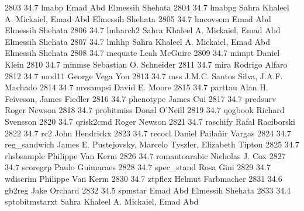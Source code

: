   2803     34.7    lmabp         Emad Abd Elmessih Shehata               
  2804     34.7    lmabpg        Sahra Khaleel A. Mickaiel, Emad Abd     
                                   Elmessih Shehata                        
  2805     34.7    lmcovsem      Emad Abd Elmessih Shehata               
  2806     34.7    lmharch2      Sahra Khaleel A. Mickaiel, Emad Abd     
                                   Elmessih Shehata                        
  2807     34.7    lmhhp         Sahra Khaleel A. Mickaiel, Emad Abd     
                                   Elmessih Shehata                        
  2808     34.7    mequate       Leah McGuire                            
  2809     34.7    mimpt         Daniel Klein                            
  2810     34.7    minmse        Sebastian O. Schneider                  
  2811     34.7    mira          Rodrigo Alfaro                          
  2812     34.7    mod11         George Vega Yon                         
  2813     34.7    mss           J.M.C. Santos Silva, J.A.F. Machado     
  2814     34.7    mvsampsi      David E. Moore                          
  2815     34.7    parttau       Alan H. Feiveson, James Fiedler         
  2816     34.7    phenotype     James Cui                               
  2817     34.7    predsurv      Roger Newson                            
  2818     34.7    probitmiss    Donal O'Neill                           
  2819     34.7    qogbook       Richard Svensson                        
  2820     34.7    qrisk2cmd     Roger Newson                            
  2821     34.7    raschify      Rafal Raciborski                        
  2822     34.7    rc2           John Hendrickx                          
  2823     34.7    recocl        Daniel Pailañir Vargas                 
  2824     34.7    reg_sandwich  James E. Pustejovsky, Marcelo Tyszler,  
                                   Elizabeth Tipton                        
  2825     34.7    rhsbsample    Philippe Van Kerm                       
  2826     34.7    romantoarabic  Nicholas J. Cox                         
  2827     34.7    scoregrp      Paulo Guimaraes                         
  2828     34.7    spec_stand    Rosa Gini                               
  2829     34.7    wdiscrim      Philippe Van Kerm                       
  2830     34.7    ztpflex       Helmut Farbmacher                       
  2831     34.6    gb2reg        Jake Orchard                            
  2832     34.5    spmstar       Emad Abd Elmessih Shehata               
  2833     34.4    sptobitmstarxt  Sahra Khaleel A. Mickaiel, Emad Abd     
